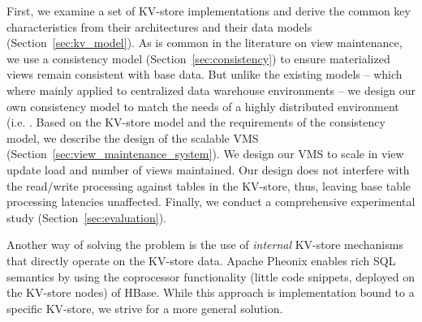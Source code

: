 First, we examine a set of KV-store implementations\cite{george:hbase,
  hewitt:cassandra, chang:bigtable, cooper:pnuts} and derive the
common key characteristics from their architectures and their data
models (Section~\ref{sec:kv_model}). As is common in the literature on
view maintenance, we use a consistency model
(Section~\ref{sec:consistency}) to ensure materialized views remain
consistent with base data. But unlike the existing
models\cite{zhuge:view, wang:efficient, zhang:parallel} -- which where
mainly applied to centralized data warehouse environments -- we design
our own consistency model to match the needs of a highly distributed
environment (i.e. \KVSs\). Based on the KV-store model and the
requirements of the consistency model, we describe the design of the
scalable VMS (Section~\ref{sec:view_maintenance_system}).  We design
our VMS to scale in view update load and number of views
maintained. Our design does not interfere with the read/write
processing against tables in the KV-store, thus, leaving base table
processing latencies unaffected. Finally, we conduct a comprehensive
experimental study (Section~\ref{sec:evaluation}).



Another way of solving the problem is the use of \textit{internal} 
KV-store mechanisms that directly operate on the KV-store data. Apache 
Pheonix \cite{phoenix:apache} enables rich SQL 
semantics by using the coprocessor functionality (little code snippets, 
deployed on the KV-store nodes) of HBase. While this approach is 
implementation bound to a specific KV-store, we strive for a more general 
solution. 
 




